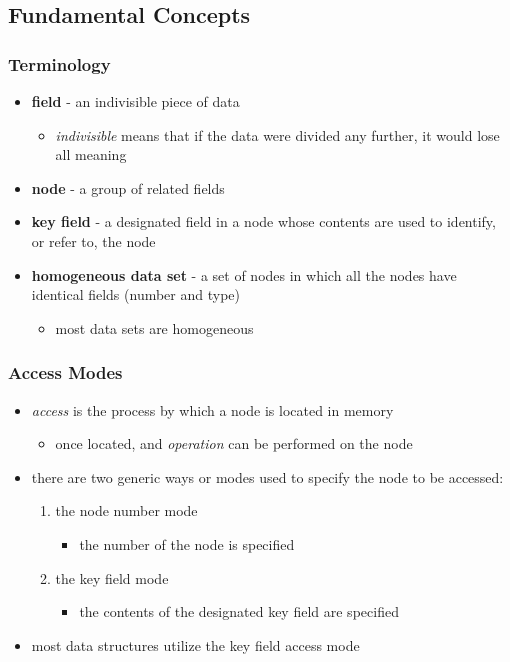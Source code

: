 \documentclass[11pt]{article}
\begin{document}
\subsection{Fundamental Concepts}
\label{sec:orgbaf55e0}
\subsubsection{Terminology}
\label{sec:org1361b10}
\begin{itemize}
\item \textbf{field} - an indivisible piece of data
\begin{itemize}
\item \emph{indivisible} means that if the data were divided any further, it would lose all meaning
\end{itemize}
\item \textbf{node} - a group of related fields
\item \textbf{key field} - a designated field in a node whose contents are used to identify, or refer to, the node
\item \textbf{homogeneous data set} - a set of nodes in which all the nodes have identical fields (number and type)
\begin{itemize}
\item most data sets are homogeneous
\end{itemize}
\end{itemize}
\subsubsection{Access Modes}
\label{sec:org2173997}
\begin{itemize}
\item \emph{access} is the process by which a node is located in memory
\begin{itemize}
\item once located, and \emph{operation} can be performed on the node
\end{itemize}
\item there are two generic ways or modes used to specify the node to be accessed:
\begin{enumerate}
\item the node number mode
\begin{itemize}
\item the number of the node is specified
\end{itemize}
\item the key field mode
\begin{itemize}
\item the contents of the designated key field are specified
\end{itemize}
\end{enumerate}
\item most data structures utilize the key field access mode
\end{itemize}
\end{document}
